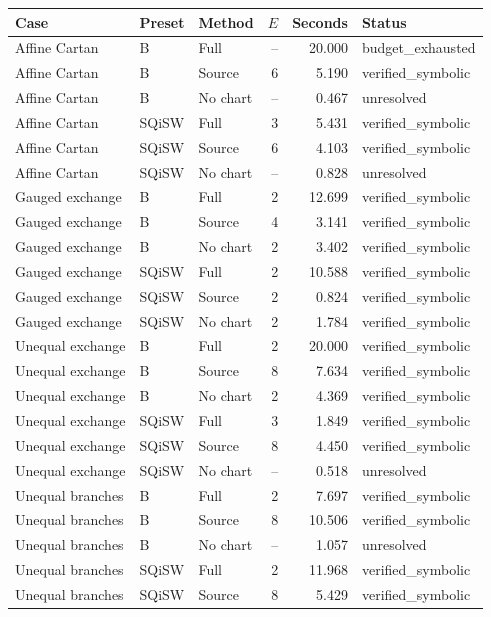 \begin{center}\scriptsize\begin{tabular}{lllrrl}\toprule
Case & Preset & Method & $E$ & Seconds & Status\\\midrule
Affine Cartan & B & Full & -- & 20.000 & budget\_exhausted\\
Affine Cartan & B & Source & 6 & 5.190 & verified\_symbolic\\
Affine Cartan & B & No chart & -- & 0.467 & unresolved\\
Affine Cartan & SQiSW & Full & 3 & 5.431 & verified\_symbolic\\
Affine Cartan & SQiSW & Source & 6 & 4.103 & verified\_symbolic\\
Affine Cartan & SQiSW & No chart & -- & 0.828 & unresolved\\
Gauged exchange & B & Full & 2 & 12.699 & verified\_symbolic\\
Gauged exchange & B & Source & 4 & 3.141 & verified\_symbolic\\
Gauged exchange & B & No chart & 2 & 3.402 & verified\_symbolic\\
Gauged exchange & SQiSW & Full & 2 & 10.588 & verified\_symbolic\\
Gauged exchange & SQiSW & Source & 2 & 0.824 & verified\_symbolic\\
Gauged exchange & SQiSW & No chart & 2 & 1.784 & verified\_symbolic\\
Unequal exchange & B & Full & 2 & 20.000 & verified\_symbolic\\
Unequal exchange & B & Source & 8 & 7.634 & verified\_symbolic\\
Unequal exchange & B & No chart & 2 & 4.369 & verified\_symbolic\\
Unequal exchange & SQiSW & Full & 3 & 1.849 & verified\_symbolic\\
Unequal exchange & SQiSW & Source & 8 & 4.450 & verified\_symbolic\\
Unequal exchange & SQiSW & No chart & -- & 0.518 & unresolved\\
Unequal branches & B & Full & 2 & 7.697 & verified\_symbolic\\
Unequal branches & B & Source & 8 & 10.506 & verified\_symbolic\\
Unequal branches & B & No chart & -- & 1.057 & unresolved\\
Unequal branches & SQiSW & Full & 2 & 11.968 & verified\_symbolic\\
Unequal branches & SQiSW & Source & 8 & 5.429 & verified\_symbolic\\

\end{tabular}
\end{center}
